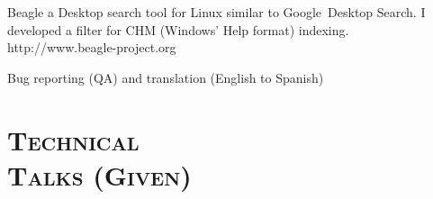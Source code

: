 \begin{resume}
\begin{position}
Beagle a Desktop search tool  for Linux similar to
Google\texttrademark  \  Desktop
Search. I developed a filter for CHM (Windows' Help format) indexing.
http://www.beagle-project.org
\end{position}

\begin{position}
Bug reporting (QA) and translation (English to Spanish)
\end{position}


   




\section{\textsc{Technical \\ Talks (Given)}}


\end{resume}
